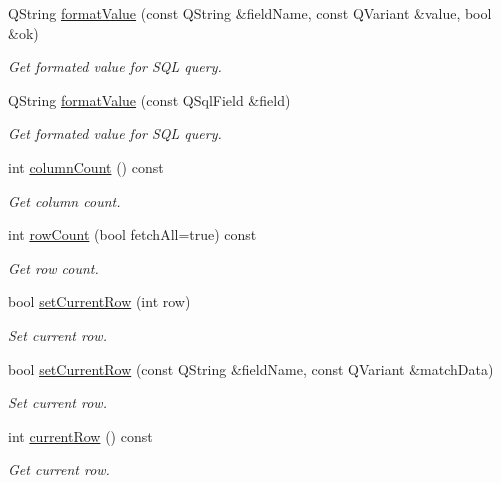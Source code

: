 \begin{DoxyCompactItemize}
Q\-String \hyperlink{classmdt_abstract_sql_table_controller_a1cd1d86cde47b62ca4a272f4334adf9d}{format\-Value} (const Q\-String \&field\-Name, const Q\-Variant \&value, bool \&ok)
\begin{DoxyCompactList}\small\item\em Get formated value for S\-Q\-L query. \end{DoxyCompactList}\item 
Q\-String \hyperlink{classmdt_abstract_sql_table_controller_ae42bd2919d96b66e9dcd73f041b6ad58}{format\-Value} (const Q\-Sql\-Field \&field)
\begin{DoxyCompactList}\small\item\em Get formated value for S\-Q\-L query. \end{DoxyCompactList}\item 
int \hyperlink{classmdt_abstract_sql_table_controller_a0dd5f5dc2934dc16ee80cbe03fc0473b}{column\-Count} () const 
\begin{DoxyCompactList}\small\item\em Get column count. \end{DoxyCompactList}\item 
int \hyperlink{classmdt_abstract_sql_table_controller_a91b9d8a7e7ab41e142baf9ba149c428e}{row\-Count} (bool fetch\-All=true) const 
\begin{DoxyCompactList}\small\item\em Get row count. \end{DoxyCompactList}\item 
bool \hyperlink{classmdt_abstract_sql_table_controller_a305a1a31db83f0f49f4a4166c4d1cad1}{set\-Current\-Row} (int row)
\begin{DoxyCompactList}\small\item\em Set current row. \end{DoxyCompactList}\item 
bool \hyperlink{classmdt_abstract_sql_table_controller_a496e148f79e951c42bb13230ea49ccd1}{set\-Current\-Row} (const Q\-String \&field\-Name, const Q\-Variant \&match\-Data)
\begin{DoxyCompactList}\small\item\em Set current row. \end{DoxyCompactList}\item 
int \hyperlink{classmdt_abstract_sql_table_controller_a111a56537a1ed200e631e1efcd4a2244}{current\-Row} () const 
\begin{DoxyCompactList}\small\item\em Get current row. \end{DoxyCompactList}\item 

\end{DoxyCompactItemize}
